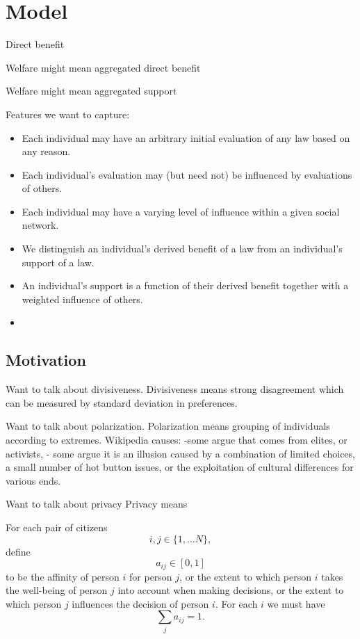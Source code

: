 
\section{Model}
\label{sec:model} 

Direct benefit

Welfare might mean aggregated direct benefit

Welfare might mean aggregated support


Features we want to capture:

\begin{itemize}
\item Each individual may have an arbitrary initial evaluation of any law based on any reason.
\item Each individual's evaluation may (but need not) be influenced by evaluations of others.
\item Each individual may have a varying level of influence within a given social network.
\item We distinguish an individual's derived benefit of a law from an individual's support of a law. 
\item An individual's support is a function of their derived benefit together with a weighted influence of others. %
\item 
\end{itemize}

\subsection{Motivation}
Want to talk about divisiveness.
Divisiveness means strong disagreement which can be measured by standard deviation in preferences.

Want to talk about polarization.
Polarization means grouping of individuals according to extremes.
Wikipedia causes: 
-some argue that comes from elites, or activists,
- some argue it is an illusion caused by a combination of limited choices, a small number of hot button issues, or the exploitation of cultural differences for various ends.

Want to talk about privacy
Privacy means

For each pair of citizens $$i,j\in\{1,\dots N\},$$ define $$a_{ij}\in [0,1]$$ to be the affinity of person $i$ for person $j$, or the extent to which person $i$ takes the well-being of person $j$ into account when making decisions, or the extent to which person $j$ influences the decision of person $i$. For each $i$ we must have $$\sum_ja_{ij}=1.$$%


